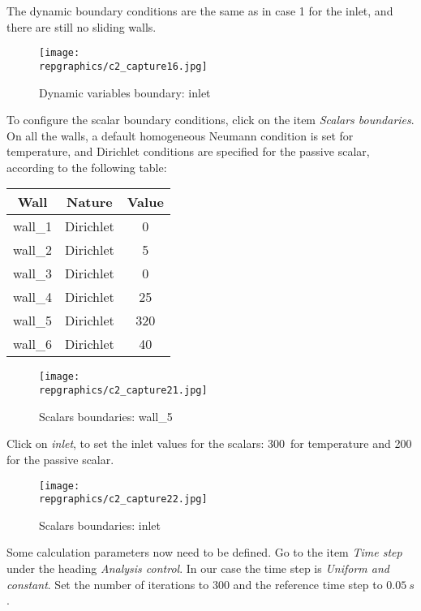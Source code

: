 \newpage
The dynamic boundary conditions are the same as in case 1 for the inlet, and
there are still no sliding walls.


\begin{figure}[h!]
\begin{center}
\texttt{[image: \\repgraphics/c2\_capture16.jpg]} 
\caption{Dynamic variables boundary: inlet}
\label{fig16_e2}
\end{center}
\end{figure}


\newpage
To configure the scalar boundary conditions, click on the item
{\itshape Scalars boundaries}.
On all the walls, a default homogeneous Neumann condition is set for
temperature, and Dirichlet conditions are specified for the passive scalar,
according to the following table:
\begin{center}
\begin{tabular}{|c|c|c|}
\hline
Wall & Nature & Value \\
\hline 
wall\_1 & Dirichlet  & 0 \\ 
\hline 
wall\_2 & Dirichlet  & 5 \\ 
\hline 
wall\_3 & Dirichlet  & 0 \\ 
\hline 
wall\_4 & Dirichlet  & 25 \\ 
\hline 
wall\_5 & Dirichlet  & 320 \\ 
\hline 
wall\_6 & Dirichlet  & 40 \\ 
\hline
\end{tabular} 
\end{center}

\begin{figure}[h!]
\begin{center}
\texttt{[image: \\repgraphics/c2\_capture21.jpg]} 
\caption{Scalars boundaries: wall\_5}
\label{fig21_e2}
\end{center}
\end{figure}


\newpage
Click on {\itshape inlet}, to set the inlet values for the scalars: 300\degresC\
for temperature and 200 for the passive scalar. 

\begin{figure}[h!]
\begin{center}
\texttt{[image: \\repgraphics/c2\_capture22.jpg]} 
\caption{Scalars boundaries: inlet}
\label{fig22_e2}
\end{center}
\end{figure}


\newpage
Some calculation parameters now need to be defined.
Go to the item {\itshape Time step} under the heading
{\itshape Analysis control}. In our case the time step is
{\itshape Uniform and constant}. Set the number of iterations to 300 and the
reference time step to $0.05\ s$. 

